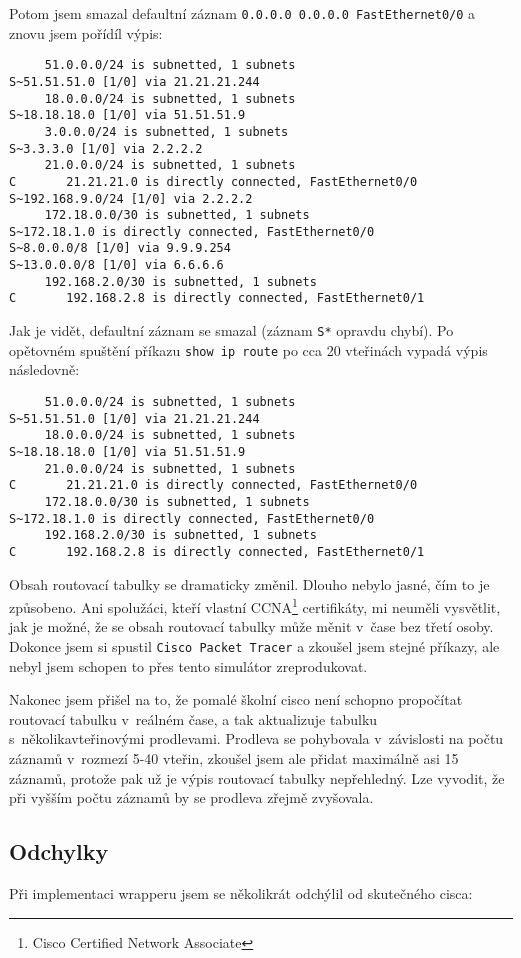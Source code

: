 Potom jsem smazal defaultní záznam \verb|0.0.0.0 0.0.0.0 FastEthernet0/0| a znovu jsem pořídíl výpis:
\begin{verbatim}
     51.0.0.0/24 is subnetted, 1 subnets
S~51.51.51.0 [1/0] via 21.21.21.244
     18.0.0.0/24 is subnetted, 1 subnets
S~18.18.18.0 [1/0] via 51.51.51.9
     3.0.0.0/24 is subnetted, 1 subnets
S~3.3.3.0 [1/0] via 2.2.2.2
     21.0.0.0/24 is subnetted, 1 subnets
C       21.21.21.0 is directly connected, FastEthernet0/0
S~192.168.9.0/24 [1/0] via 2.2.2.2
     172.18.0.0/30 is subnetted, 1 subnets
S~172.18.1.0 is directly connected, FastEthernet0/0
S~8.0.0.0/8 [1/0] via 9.9.9.254
S~13.0.0.0/8 [1/0] via 6.6.6.6
     192.168.2.0/30 is subnetted, 1 subnets
C       192.168.2.8 is directly connected, FastEthernet0/1
\end{verbatim} 
Jak je vidět, defaultní záznam se smazal (záznam \verb|S*| opravdu chybí). Po opětovném spuštění příkazu \verb|show ip route| po cca 20 vteřinách vypadá výpis následovně:
\begin{verbatim}
     51.0.0.0/24 is subnetted, 1 subnets
S~51.51.51.0 [1/0] via 21.21.21.244
     18.0.0.0/24 is subnetted, 1 subnets
S~18.18.18.0 [1/0] via 51.51.51.9
     21.0.0.0/24 is subnetted, 1 subnets
C       21.21.21.0 is directly connected, FastEthernet0/0
     172.18.0.0/30 is subnetted, 1 subnets
S~172.18.1.0 is directly connected, FastEthernet0/0
     192.168.2.0/30 is subnetted, 1 subnets
C       192.168.2.8 is directly connected, FastEthernet0/1
\end{verbatim} 

Obsah routovací tabulky se dramaticky změnil. Dlouho nebylo jasné, čím to je způsobeno. Ani spolužáci, kteří vlastní CCNA\footnote{Cisco Certified Network Associate} certifikáty, mi neuměli vysvětlit, jak je možné, že se obsah routovací tabulky může měnit v~čase bez třetí osoby. Dokonce jsem si spustil \verb|Cisco Packet Tracer| a zkoušel jsem stejné příkazy, ale nebyl jsem schopen to přes tento simulátor zreprodukovat.

Nakonec jsem přišel na to, že pomalé školní cisco není schopno propočítat routovací tabulku v~reálném čase, a tak aktualizuje tabulku s~několikavteřinovými prodlevami. Prodleva se pohybovala v~závislosti na počtu záznamů v~rozmezí 5-40 vteřin, zkoušel jsem ale přidat maximálně asi 15 záznamů, protože pak už je výpis routovací tabulky nepřehledný. Lze vyvodit, že při vyšším počtu záznamů by se prodleva zřejmě zvyšovala. 

\subsection{Odchylky}
Při implementaci wrapperu jsem se několikrát odchýlil od skutečného cisca:

